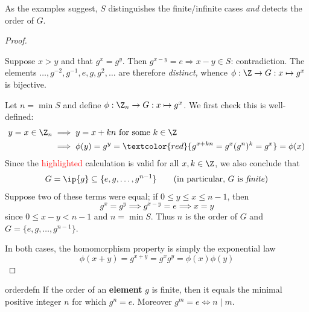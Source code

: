 As the examples suggest, $S$ distinguishes the finite/infinite cases \emph{and} detects the order of $G$.

\begin{proof}
	\begin{description}\itemsep2pt
		\item[\normalfont If $S=\emptyset$:] Suppose $x>y$ and that $g^x=g^y$. Then $g^{x-y}=e\Longrightarrow x-y\in S$: contradiction. The elements $\ldots,g^{-2},g^{-1},e,g,g^2,\ldots$ are therefore \emph{distinct,} whence $\phi:\Z\to G:x\mapsto g^x$ is bijective.
		\item[\normalfont If $S\neq\emptyset$:] Let	$n=\min S$ and define $\phi:\Z_n\to G:x\mapsto g^x$. We first check this is well-defined:
		\begin{align*}
			y=x\in\Z_n&\implies y=x+kn\text{ for some $k\in\Z$}\\
			&\implies \phi(y)=g^y=\textcolor{red}{g^{x+kn}=g^x(g^n)^k=g^x}=\phi(x)
		\end{align*}
		Since the \textcolor{red}{highlighted} calculation is valid for all $x,k\in\Z$, we also conclude that
		\[
			G=\ip{g}\subseteq\{e,g,\ldots,g^{n-1}\} \tag{in particular, $G$ is \emph{finite}}
		\]
		Suppose two of these terms were equal; if $0\le y\le x\le n-1$, then
		\[
			g^x=g^y\implies g^{x-y}=e\implies x=y
		\]
		since $0\le x-y<n-1$ and $n=\min S$. Thus $n$ is the order of $G$ and $G=\{e,g,\ldots,g^{n-1}\}$.
	\end{description}\medskip
	In both cases, the homomorphism property is simply the exponential law
	\[
		\phi(x+y)=g^{x+y}=g^xg^y=\phi(x)\phi(y)\tag*{\qedhere}
	\]
\end{proof}


\begin{cor}{}{orderdefn}
	If the order of an \textbf{element} $g$ is finite, then it equals the minimal positive integer $n$ for which $g^n=e$. Moreover $g^m=e\Longleftrightarrow n\mid m$.
\end{cor}


\goodbreak

